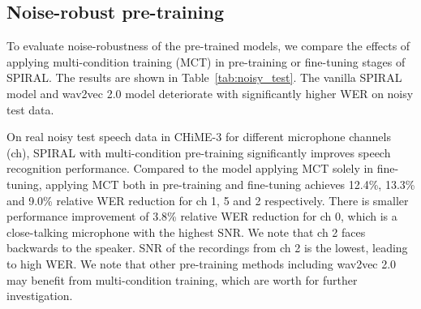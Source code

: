 \subsection{Noise-robust pre-training}

\begin{table}[t]
   \caption{Evaluation on noise-robustness of the models. We use wav2vec 2.0 \tscbase{} released by the authors as the baseline. The SPIRAL \tscbase{} models are pre-trained with \librisz{} and fine-tuned with train-clean-100. We report WER (\%) on \libri{} and CHiME-3 real data test sets.}
   \label{tab:noisy_test}
   \centering

\end{table}

To evaluate noise-robustness of the pre-trained models, we compare the effects of applying multi-condition training (MCT) in pre-training or fine-tuning stages of SPIRAL.
The results are shown in Table~\ref{tab:noisy_test}.
The vanilla SPIRAL \tscbase{} model and wav2vec 2.0 \tscbase{} model deteriorate with significantly higher WER on noisy test data. 

On real noisy test speech data in CHiME-3 for different microphone channels (ch), SPIRAL with multi-condition pre-training significantly improves speech recognition performance.  
Compared to the model applying MCT solely in fine-tuning, applying MCT both in pre-training and fine-tuning achieves 12.4\%, 13.3\% and 9.0\% relative WER reduction for ch 1, 5 and 2 respectively. There is smaller performance improvement of 3.8\% relative WER reduction for ch 0, which is a close-talking microphone with the highest SNR. We note that ch 2 faces backwards to the speaker. SNR of the recordings from ch 2 is the lowest, leading to high WER. 
We note that other pre-training methods including wav2vec 2.0 may benefit from multi-condition training, which are worth for further investigation.

